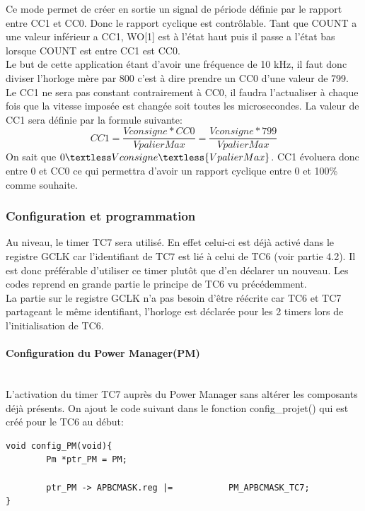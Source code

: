 \documentclass[a4paper]{article}
\begin{document}
    Ce mode permet de créer en sortie un signal de période définie par le rapport entre CC1 et CC0. Donc le rapport cyclique est contrôlable. Tant que COUNT a une valeur inférieur a CC1, WO[1] est à l'état haut puis il passe a l'état bas lorsque COUNT est entre CC1 est CC0. \\
    Le but de cette application étant d'avoir une fréquence de 10 kHz, il faut donc diviser l'horloge mère par 800 c'est à dire prendre un CC0 d'une valeur de 799. \\
    Le CC1 ne sera pas constant contrairement à CC0, il faudra l'actualiser à chaque fois que la vitesse imposée est changée soit toutes les microsecondes. La valeur de CC1 sera définie par la formule suivante:
    \begin{equation}
		CC1 = {\frac {Vconsigne*CC0} {VpalierMax}}={\frac {Vconsigne*799} {VpalierMax}}
	\end{equation}
    On sait que $0 \textless Vconsigne \textless {VpalierMax}$. CC1 évoluera donc entre 0 et CC0 ce qui permettra d'avoir un rapport cyclique entre 0 et 100\% comme souhaite.\\
    \subsubsection{Configuration et programmation}
    Au niveau, le timer TC7 sera utilisé. En effet celui-ci est déjà activé dans le registre GCLK car l’identifiant de TC7 est lié à celui de TC6 (voir partie 4.2). Il est donc préférable d’utiliser ce timer plutôt que d’en déclarer un nouveau. Les codes reprend en grande partie le principe de TC6 vu précédemment. \\
    La partie sur le registre GCLK n’a pas besoin d’être réécrite car TC6 et TC7 partageant le même identifiant, l’horloge est déclarée pour les 2 timers lors de l’initialisation de TC6. \\
    \paragraph{Configuration du Power Manager(PM)} ~~\\
    L’activation du timer TC7 auprès du Power Manager sans altérer les composants déjà présents. On ajout le code suivant dans le fonction config\_projet() qui est créé pour le TC6 au début:
    \begin{lstlisting}[style=CStyle]
void config_PM(void){
	    Pm *ptr_PM = PM;

	    ptr_PM -> APBCMASK.reg |=           PM_APBCMASK_TC7;
}
    \end{lstlisting}
\end{document}
